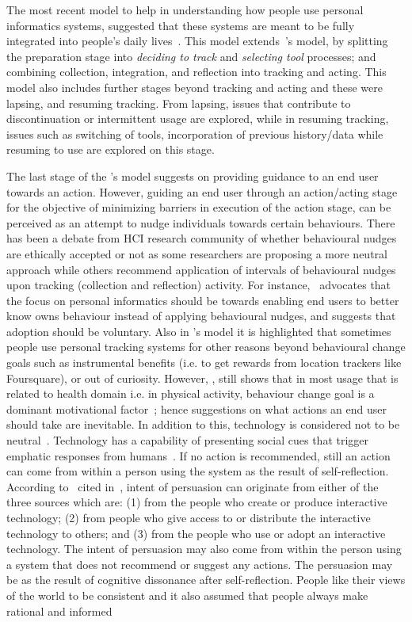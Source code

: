 The most recent model to help in understanding how people use personal informatics systems, suggested that these systems are meant to be fully integrated into people's daily lives~\citep{epstein2015lived}. This model extends~\cite{li2010stage}'s model, by splitting the preparation stage into \emph{deciding to track} and \emph{selecting tool} processes; and combining collection, integration, and reflection into tracking and acting. This model also includes further stages beyond tracking and acting and these were lapsing, and resuming tracking.  From lapsing, issues that contribute to discontinuation or intermittent usage are explored, while in resuming tracking, issues such as switching of tools, incorporation of previous history/data while resuming to use are explored on this stage.  

The last stage of the \cite{li2010stage}'s model suggests on providing guidance to an end user towards an action. However, guiding an end user through an action/acting stage for the objective of minimizing barriers in execution of the action stage, can be perceived as an attempt to nudge individuals towards certain behaviours. There has been a debate from HCI research community of whether behavioural nudges are ethically accepted or not as some researchers are proposing a more neutral approach while others recommend application of intervals of behavioural nudges upon tracking (collection and reflection) activity.  For instance,~\cite{munson2012mindfulness} advocates that the focus on personal informatics  should be towards enabling end users to better know owns behaviour instead of applying behavioural nudges, and suggests that adoption should be voluntary. Also in \cite{epstein2015lived}'s model it is highlighted that sometimes people use personal tracking systems for other reasons beyond behavioural change goals such as instrumental benefits (i.e. to get rewards from location trackers like Foursquare), or out of curiosity. However, \cite{epstein2015lived}, still  shows that in most usage that is related to health domain i.e. in physical activity, behaviour change goal is a dominant motivational factor~\citep{epstein2015lived}; hence suggestions on what actions an end user should take are inevitable. In addition to this, technology is considered not to be neutral~\citep{Oinas-kukkonen:psd}. Technology has a capability of presenting social cues that trigger emphatic responses from humans~\citep{foggpersuasivebook}. If no action is recommended, still an action can come from within a person using the system as the result of self-reflection. According to~\cite{fogg1998persuasive} cited in~\cite{Oinas-kukkonen:psd}, intent of persuasion can originate from either of the three sources which are: (1) from the people who create or produce interactive technology; (2) from people who give access to or distribute the interactive technology to others; and (3) from the people who use or adopt an interactive technology. The intent of persuasion may also come from within the person using a system that does not recommend or suggest any actions. The persuasion may be as the result of cognitive dissonance after self-reflection. People like their views of the world to be consistent and it also assumed that people always make rational and informed 